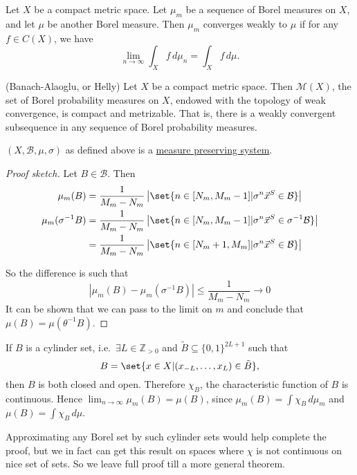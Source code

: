 \documentclass{article}
\begin{document}
\begin{defi}
  Let $X$ be a compact metric space.
  Let $\mu_m$ be a sequence of Borel measures on $X$, and let $\mu$ be another Borel measure.
  Then $\mu_m$ converges weakly to $\mu$ if for any $f\in C(X)$, we have
  \begin{equation*}
    \lim _{n \to \infty} \int_X f \,d \mu_{n} = \int_X f \,d \mu.
  \end{equation*}
\end{defi}

\begin{thm}(Banach-Alaoglu, or Helly)
  Let $X$ be a compact metric space.
  Then $\mathcal{M}(X)$, the set of Borel probability measures on $X$, endowed with the topology of weak convergence, is compact and metrizable.
  That is, there is a weakly convergent subsequence in any sequence of Borel probability measures.
\end{thm}

\begin{lemma}
  $(X, \mathcal{B}, \mu, \sigma)$ as defined above is a \hyperlink{def:mps}{measure preserving system}.
\end{lemma}
\begin{proof}[Proof sketch]
  Let $B \in \mathcal{B}$. Then
  \begin{align*}
    \mu_m(B) &= \frac{1}{M_m - N_m} \left|\set{n \in [N_m, M_m -1] | \sigma^n \vec{x}^S \in \mathcal{B}} \right| \\
    \mu_m(\sigma^{-1} B) &= \frac{1}{M_m - N_m} \left|\set{n \in [N_m, M_m -1] | \sigma^n \vec{x}^S \in \sigma^{-1}\mathcal{B}} \right| \\
                         &= \frac{1}{M_m - N_m} \left|\set{n \in [N_m+1, M_m] | \sigma^n \vec{x}^S \in \mathcal{B}} \right|
  \end{align*}

  So the difference is such that
  \[ \left|\mu_m(B) - \mu_m(\sigma^{-1}B)\right| \leq \frac{1}{M_m-N_m}\to 0 \]
  It can be shown that we can pass to the limit on $ m $ and conclude that $ \mu(B) = \mu(\theta^{-1}B)$.
\end{proof}

\begin{remark}
  If $B$ is a cylinder set, i.e.\ $\exists L \in \mathbb{Z}_{>0}$ and $\tilde{B} \subseteq \{0,1\}^{2L+1}$ such that
  \begin{equation*}
    B = \set{x \in X | (x_{-L}, \dotsc, x_L) \in \tilde{B}},
  \end{equation*}
  then $B$ is both closed and open.
  Therefore $\chi_B$, the characteristic function of $B$ is continuous.
  Hence $\lim_{n \to \infty} \mu_m(B) = \mu(B)$, since $\mu_m(B) = \int \chi_B \, d \mu_m$ and $\mu(B) = \int \chi_B \, d \mu$.

  Approximating any Borel set by such cylinder sets would help complete the proof, but we in fact can get this result on spaces where $ \chi $ is not continuous on nice set of sets. So we leave full proof till a more general theorem.
\end{remark}
\end{document}
